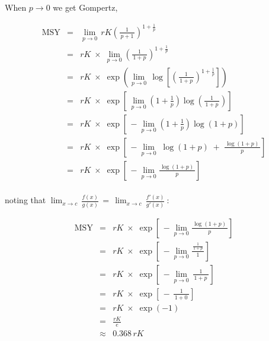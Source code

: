 \documentclass[fleqn]{article}
\newcommand{\MSY}{\mathrm{MSY}}
\begin{document}
\newpage

When $p\!\to\!0$ we get Gompertz,

\begin{eqnarray*}
  \MSY &=& \lim_{p\to 0}\,
  rK\!\left(\!\frac{1}{\,p\!+\!1\,}\!\right)^{\!1+\frac{1}{p}}        \\[1em]
  ~    &=& rK \;\times\; \lim_{p\to 0}
  \left(\!\frac{1}{\,1\!+\!p\,}\!\right)^{\!1+\frac{1}{p}}            \\[1em]
  ~    &=& rK \;\times\; \exp\!\left(\lim_{p\to 0}\,
    \log\left[\left(\!\frac{1}{\,1\!+\!p\,}\!\right)^{\!1+\frac{1}{p}}
    \right]\right)                                                    \\[1em]
  ~    &=& rK \;\times\; \exp\!\left[\,\lim_{p\to 0}
    \left(\!1\!+\!\frac{1}{p}\right)
    \log\!\left(\!\frac{1}{\,1\!+\!p\,}\!\right)\right]               \\[1em]
  ~    &=& rK \;\times\; \exp\!\left[\,-\lim_{p\to 0}
    \left(\!1\!+\!\frac{1}{p}\right)\log(1\!+\!p)\right]              \\[1em]
  ~    &=& rK \;\times\; \exp\!\left[\,-\lim_{p\to 0}\;
    \log(1\!+\!p) \;+\; \frac{\,\log(1\!+\!p)\,}{p}\right]            \\[1em]
  ~    &=& rK \;\times\; \exp\!\left[\,-\lim_{p\to 0}
    \frac{\,\log(1\!+\!p)\,}{p}\right]                                \\[1ex]
\end{eqnarray*}

noting that $\displaystyle\lim_{x\to
  c}\,\frac{f(x)}{g(x)}\,=\,\displaystyle\lim_{x\to c}\,\frac{f'(x)}{g'(x)}\:$:

\begin{eqnarray*}
  \MSY &=&      rK \;\times\;
  \exp\!\left[\,-\lim_{p\to 0} \frac{\,\log(1\!+\!p)\,}{p}\right]\\[1em]
  ~    &=&        rK \;\times\;
  \exp\!\left[\,-\lim_{p\to 0}\frac{\,\frac{1}{1+p}\,}{1}\right]\\[1em]
  ~    &=&       rK \;\times\;
  \exp\!\left[\,-\lim_{p\to 0}\,\frac{1}{\,1\!+\!p\;}\right]    \\[1em]
  ~    &=&       rK \;\times\;
  \exp\!\left[\,-\,\frac{1}{\,1\!+\!0\;}\right]                 \\[1em]
  ~    &=&       rK \;\times\; \exp(-1)                         \\[1em]
  ~    &=&       \frac{rK}{e}                                   \\[1em]
  ~    &\approx& 0.368\,rK
\end{eqnarray*}
\end{document}
